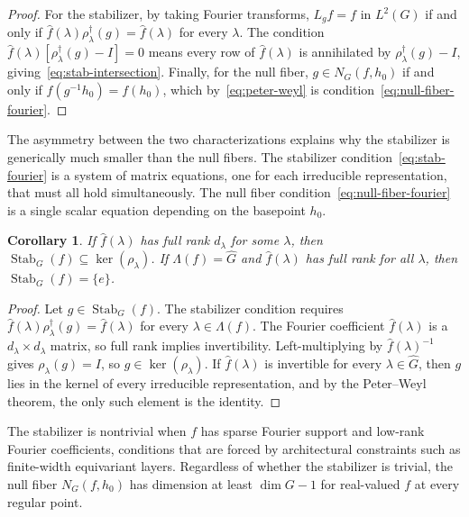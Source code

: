 \documentclass[11pt]{article}
\newtheorem{corollary}[theorem]{Corollary}
\DeclareMathOperator{\kernel}{ker}
\DeclareMathOperator{\Stab}{Stab}
\newcommand{\fhat}{\hat{f}}
\begin{document}
\begin{proof}
For the stabilizer, by taking Fourier transforms, $L_g f = f$ in $L^2(G)$ if and only if $\fhat(\lambda)\rho_\lambda^\dagger(g) = \fhat(\lambda)$ for every $\lambda$. The condition $\fhat(\lambda)[\rho_\lambda^\dagger(g) - I] = 0$ means every row of $\fhat(\lambda)$ is annihilated by $\rho_\lambda^\dagger(g) - I$, giving~\eqref{eq:stab-intersection}. Finally, for the null fiber, $g \in N_G(f, h_0)$ if and only if $f(g^{-1} h_0) = f(h_0)$, which by~\eqref{eq:peter-weyl} is condition~\eqref{eq:null-fiber-fourier}.
\end{proof}

The asymmetry between the two characterizations explains why the stabilizer is generically much smaller than the null fibers. The stabilizer condition~\eqref{eq:stab-fourier} is a system of matrix equations, one for each irreducible representation, that must all hold simultaneously. The null fiber condition~\eqref{eq:null-fiber-fourier} is a single scalar equation depending on the basepoint $h_0$.

\begin{corollary}\label{cor:dimension}
If $\fhat(\lambda)$ has full rank $d_\lambda$ for some $\lambda$, then $\Stab_G(f) \subseteq \kernel(\rho_\lambda)$. If $\Lambda(f) = \hat{G}$ and $\fhat(\lambda)$ has full rank for all $\lambda$, then $\Stab_G(f) = \{e\}$.
\end{corollary}
\begin{proof}
Let $g\in\Stab_G(f)$. The stabilizer condition requires $\fhat(\lambda)\rho_\lambda^\dagger(g) = \fhat(\lambda)$ for every $\lambda \in \Lambda(f)$. The Fourier coefficient $\fhat(\lambda)$ is a $d_\lambda \times d_\lambda$ matrix, so full rank implies invertibility. Left-multiplying by $\fhat(\lambda)^{-1}$ gives $\rho_\lambda(g) = I$, so $g \in \kernel(\rho_\lambda)$. If $\fhat(\lambda)$ is invertible for every $\lambda \in \hat{G}$, then $g$ lies in the kernel of every irreducible representation, and by the Peter--Weyl theorem, the only such element is the identity.
\end{proof}

The stabilizer is nontrivial when $f$ has sparse Fourier support and low-rank Fourier coefficients, conditions that are forced by architectural constraints such as finite-width equivariant layers. Regardless of whether the stabilizer is trivial, the null fiber $N_G(f, h_0)$ has dimension at least $\dim G - 1$ for real-valued $f$ at every regular point.
\end{document}
